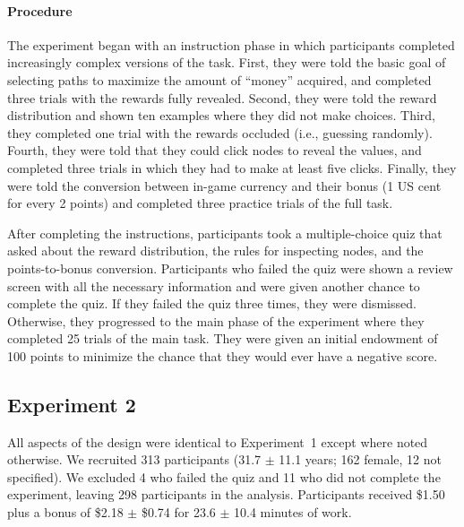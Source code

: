 \paragraph{Procedure}
The experiment began with an instruction phase in which participants completed increasingly complex versions of the task. First, they were told the basic goal of selecting paths to maximize the amount of ``money'' acquired, and completed three trials with the rewards fully revealed. Second, they were told the reward distribution and shown ten examples where they did not make choices. Third, they completed one trial with the rewards occluded (i.e., guessing randomly). Fourth, they were told that they could click nodes to reveal the values, and completed three trials in which they had to make at least five clicks. Finally, they were told the conversion between in-game currency and their bonus (1 US cent for every 2 points) and completed three practice trials of the full task.

After completing the instructions, participants took a multiple-choice quiz that asked about the reward distribution, the rules for inspecting nodes, and the points-to-bonus conversion. Participants who failed the quiz were shown a review screen with all the necessary information and were given another chance to complete the quiz. If they failed the quiz three times, they were dismissed. Otherwise, they progressed to the main phase of the experiment where they completed 25 trials of the main task. They were given an initial endowment of 100 points to minimize the chance that they would ever have a negative score.

\subsection{Experiment 2}\label{sec:planning-methods2}
All aspects of the design were identical to Experiment~1 except where noted otherwise. We recruited 313 participants (31.7 $\pm$ 11.1 years; 162 female, 12 not specified). We excluded 4 who failed the quiz and 11 who did not complete the experiment, leaving 298 participants in the analysis. Participants received \$1.50 plus a bonus of \$2.18 $\pm$ \$0.74 for 23.6 $\pm$ 10.4 minutes of work.

